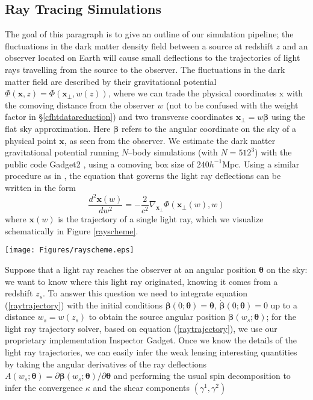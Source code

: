 \documentclass[reprint,aps,prd,superscriptaddress,showkeys,showpacs]{revtex4-1}
\begin{document}
\subsection{Ray Tracing Simulations}
\label{raysim}
The goal of this paragraph is to give an outline of our simulation pipeline; the fluctuations in the dark matter density field between a source at redshift $z$ and an observer located on Earth will cause small deflections to the trajectories of light rays travelling from the source to the observer. The fluctuations in the dark matter field are described by their gravitational potential $\Phi(\mathbf{x},z)=\Phi(\mathbf{x}_\perp,w(z))$, where we can trade the physical coordinates $\mathrm{x}$ with the comoving distance from the observer $w$ (not to be confused with the weight factor in \S\ref{cfhtdatareduction}) and two transverse coordinates $\mathbf{x}_\perp=w\pmb{\beta}$ using the flat sky approximation. Here $\pmb{\beta}$ refers to the angular coordinate on the sky of a physical point $\mathbf{x}$, as seen from the observer. We estimate the dark matter gravitational potential running $N$--body simulations (with $N=512^3$) with the public code Gadget2 \citep{Gadget2}, using a comoving box size of $240h^{-1}$Mpc. Using a similar procedure as in \citep{RayTracingJain,RayTracingHartlap}, the equation that governs the light ray deflections can be written in the form
\begin{equation}
\label{raytrajectory}
\frac{d^2\mathbf{x}(w)}{dw^2} = -\frac{2}{c^2}\nabla_{\mathbf{x}_\perp}\Phi(\mathbf{x}_\perp(w),w)
\end{equation}
%
where $\mathbf{x}(w)$ is the trajectory of a single light ray, which we visualize schematically in Figure \ref{rayscheme}. 
%
\begin{figure*}
\begin{center}
\texttt{[image: Figures/rayscheme.eps]}
\end{center}
\caption{Schematics of ray tracing with the lensing potential boosted by a factor of 50 for visualization purposes}
\label{rayscheme}
\end{figure*}
%
Suppose that a light ray reaches the observer at an angular position $\pmb{\theta}$ on the sky: we want to know where this light ray originated, knowing it comes from a redshift $z_s$. To answer this question we need to integrate equation (\ref{raytrajectory}) with the initial conditions $\pmb{\beta}(0;\pmb{\theta})=\pmb{\theta}$, $\dot{\pmb{\beta}}(0;\pmb{\theta})=0$ up to a distance $w_s=w(z_s)$ to obtain the source angular position $\pmb{\beta}(w_s;\pmb{\theta})$; for the light ray trajectory solver, based on equation (\ref{raytrajectory}), we use our proprietary implementation Inspector Gadget. Once we know the details of the light ray trajectories, we can easily infer the weak lensing interesting quantities by taking the angular derivatives of the ray deflections $A(w_s;\pmb{\theta}) = \partial \pmb{\beta}(w_s;\pmb{\theta})/\partial\pmb{\theta}$ and performing the usual spin decomposition to infer the convergence $\kappa$ and the shear components $(\gamma^1,\gamma^2)$
\end{document}
